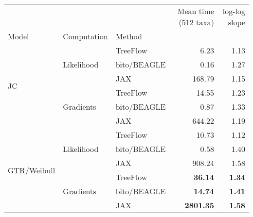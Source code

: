 \begin{tabular}{lllrr}
\toprule
 &  &  & Mean time (512 taxa) & log-log slope \\
Model & Computation & Method &  &  \\
\midrule
\multirow[t]{6}{*}{JC} & \multirow[t]{3}{*}{Likelihood} & TreeFlow & 6.23 & 1.13 \\
 &  & bito/BEAGLE & 0.16 & 1.27 \\
 &  & JAX & 168.79 & 1.15 \\
 & \multirow[t]{3}{*}{Gradients} & TreeFlow & 14.55 & 1.23 \\
 &  & bito/BEAGLE & 0.87 & 1.33 \\
 &  & JAX & 644.22 & 1.19 \\
\multirow[t]{6}{*}{GTR/Weibull} & \multirow[t]{3}{*}{Likelihood} & TreeFlow & 10.73 & 1.12 \\
 &  & bito/BEAGLE & 0.58 & 1.40 \\
 &  & JAX & 908.24 & 1.58 \\
 & \multirow[t]{3}{*}{Gradients} & TreeFlow & \bfseries 36.14 & \bfseries 1.34 \\
 &  & bito/BEAGLE & \bfseries 14.74 & \bfseries 1.41 \\
 &  & JAX & \bfseries 2801.35 & \bfseries 1.58 \\
\bottomrule
\end{tabular}
